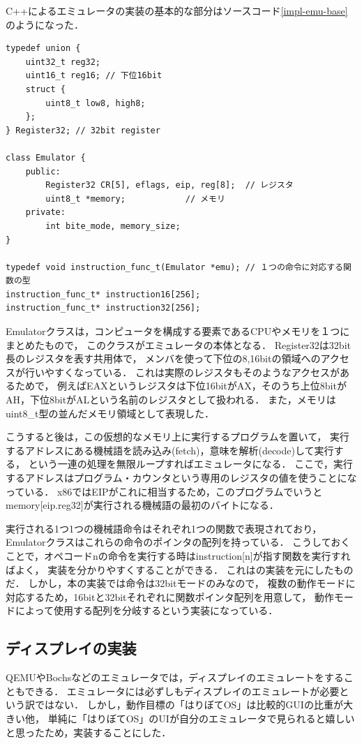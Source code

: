 \documentclass[10pt,a4j]{jsarticle}
\begin{document}
C++によるエミュレータの実装の基本的な部分はソースコード\ref{impl-emu-base}のようになった．
\begin{lstlisting}[caption=エミュレータの基本的な実装,label=impl-emu-base]
typedef union {
	uint32_t reg32;
	uint16_t reg16; // 下位16bit
	struct {
		uint8_t low8, high8;
	};
} Register32; // 32bit register

class Emulator {
	public:
		Register32 CR[5], eflags, eip, reg[8];	// レジスタ
		uint8_t *memory;			// メモリ
	private:
		int bite_mode, memory_size;
}

typedef void instruction_func_t(Emulator *emu); // １つの命令に対応する関数の型
instruction_func_t* instruction16[256];
instruction_func_t* instruction32[256];
\end{lstlisting}
Emulatorクラスは，コンピュータを構成する要素であるCPUやメモリを１つにまとめたもので，
このクラスがエミュレータの本体となる．
Register32は32bit長のレジスタを表す共用体で，
メンバを使って下位の8,16bitの領域へのアクセスが行いやすくなっている．
これは実際のレジスタもそのようなアクセスがあるためで，
例えばEAXというレジスタは下位16bitがAX，そのうち上位8bitがAH，下位8bitがALという名前のレジスタとして扱われる．
また，メモリはuint8\_t型の並んだメモリ領域として表現した．

こうすると後は，この仮想的なメモリ上に実行するプログラムを置いて，
実行するアドレスにある機械語を読み込み(fetch)，意味を解析(decode)して実行する，
という一連の処理を無限ループすればエミュレータになる．
ここで，実行するアドレスはプログラム・カウンタという専用のレジスタの値を使うことになっている．
x86ではEIPがこれに相当するため，このプログラムでいうとmemory[eip.reg32]が実行される機械語の最初のバイトになる．

実行される1つ1つの機械語命令はそれぞれ1つの関数で表現されており，
Emulatorクラスはこれらの命令のポインタの配列を持っている．
こうしておくことで，オペコードnの命令を実行する時はinstruction[n]が指す関数を実行すればよく，
実装を分かりやすくすることができる．
これは\cite{learn-x86-by-emu}の実装を元にしたものだ．
しかし，本の実装では命令は32bitモードのみなので，
複数の動作モードに対応するため，16bitと32bitそれぞれに関数ポインタ配列を用意して，
動作モードによって使用する配列を分岐するという実装になっている．
\vspace{-3mm}
\subsection{ディスプレイの実装}
QEMUやBochsなどのエミュレータでは，ディスプレイのエミュレートをすることもできる．
エミュレータには必ずしもディスプレイのエミュレートが必要という訳ではない．
しかし，動作目標の「はりぼてOS」は比較的GUIの比重が大きい他，
単純に「はりぼてOS」のUIが自分のエミュレータで見られると嬉しいと思ったため，実装することにした．
\end{document}
